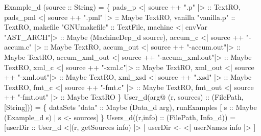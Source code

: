 \begin{code}
\mbox{}
  Example_d (source :: String) =  \{
   pads_p          <| source ++ ".p" |>            :: TextRO,         
   pads_pml        <| source ++ ".pml" |>          :: Maybe TextRO,   
   vanilla         "vanilla.p"                     :: TextRO,         
   makefile        "GNUmakefile"                   :: TextFile,       
   machine         <| envVar "AST_ARCH"|>          :: Maybe (MachineDep_d source),   
   accum_c         <| source ++ "-accum.c" |>      :: Maybe TextRO,   
   accum_out       <| source ++ "-accum.out"|>     :: Maybe TextRO,   
   accum_xml_out   <| source ++ "-accum_xml.out"|> :: Maybe TextRO,   
   xml_c           <| source ++ "-xml.c"|>         :: Maybe TextRO,   
   xml_out         <| source ++ "-xml.out"|>       :: Maybe TextRO,   
   xml_xsd         <| source ++ ".xsd" |>          :: Maybe TextRO,   
   fmt_c           <| source ++ "-fmt.c" |>        :: Maybe TextRO,   
   fmt_out         <| source ++ "-fmt.out" |>      :: Maybe TextRO    
 \}
\mbox{}
  User_d(arg@ (r, sources) :: (FilePath, [String])) =  \{
    dataSets     "data"    :: Maybe (Data_d arg),
    runExamples        [ s :: Maybe (Example_d s) | s <- sources]
  \}
\mbox{}
  Users_d((r,info) :: (FilePath, Info_d)) = 
    [userDir :: User_d <|(r, getSources info) |>  | userDir <- <| userNames info |> ]
\mbox{}
\end{code}

